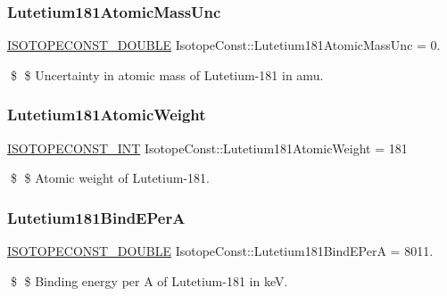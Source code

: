 \subsubsection{\texorpdfstring{Lutetium181\+Atomic\+Mass\+Unc}{Lutetium181AtomicMassUnc}}
{\footnotesize\ttfamily \mbox{\hyperlink{group___isotope_const-_macros_ga8f45a7272ce02c0b4c65c44636ed719a}{I\+S\+O\+T\+O\+P\+E\+C\+O\+N\+S\+T\+\_\+\+D\+O\+U\+B\+LE}} Isotope\+Const\+::\+Lutetium181\+Atomic\+Mass\+Unc = 0.}

\$ \$ Uncertainty in atomic mass of Lutetium-\/181 in amu. \mbox{\label{group___isotope_const-_lutetium-_lu181_ga4c459370c58f2922b1e13055a3ff6adf}} 
\subsubsection{\texorpdfstring{Lutetium181\+Atomic\+Weight}{Lutetium181AtomicWeight}}
{\footnotesize\ttfamily \mbox{\hyperlink{group___isotope_const-_macros_ga5f18360b3e99483a35c32d789e62621c}{I\+S\+O\+T\+O\+P\+E\+C\+O\+N\+S\+T\+\_\+\+I\+NT}} Isotope\+Const\+::\+Lutetium181\+Atomic\+Weight = 181}

\$ \$ Atomic weight of Lutetium-\/181. \mbox{\label{group___isotope_const-_lutetium-_lu181_ga140d07f21441435ed06da9fed78c1aae}} 
\subsubsection{\texorpdfstring{Lutetium181\+Bind\+E\+PerA}{Lutetium181BindEPerA}}
{\footnotesize\ttfamily \mbox{\hyperlink{group___isotope_const-_macros_ga8f45a7272ce02c0b4c65c44636ed719a}{I\+S\+O\+T\+O\+P\+E\+C\+O\+N\+S\+T\+\_\+\+D\+O\+U\+B\+LE}} Isotope\+Const\+::\+Lutetium181\+Bind\+E\+PerA = 8011.}

\$ \$ Binding energy per A of Lutetium-\/181 in keV. \mbox{\label{group___isotope_const-_lutetium-_lu181_ga273de36f4896ca3aa2eb261a044ad5ef}} 
